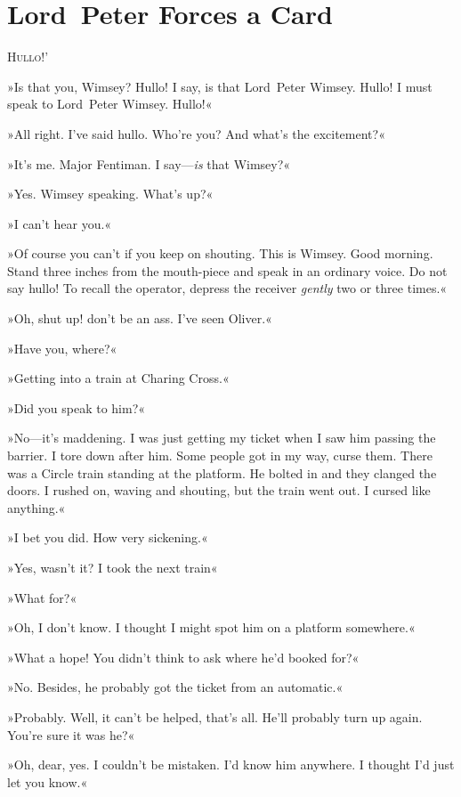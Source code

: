 \chapter{Lord~Peter Forces a Card}

\lettrine[lines=4,ante=‘]{H}{ullo}!' 

\zz
»Is that you, Wimsey? Hullo! I say, is that Lord~Peter Wimsey. Hullo! I must speak to Lord~Peter Wimsey. Hullo!« 

\zz
»All right. I've said hullo. Who're you? And what's the excitement?«

\zz
»It's me. Major Fentiman. I say—\textit{is} that Wimsey?«

»Yes. Wimsey speaking. What's up?«

»I can't hear you.«

»Of course you can't if you keep on shouting. This is Wimsey. Good morning. Stand three inches from the mouth-piece and speak in an ordinary voice. Do not say hullo! To recall the operator, depress the receiver \textit{gently} two or three times.«

»Oh, shut up! don't be an ass. I've seen Oliver.«

»Have you, where?«

»Getting into a train at Charing Cross.«

»Did you speak to him?«

»No—it's maddening. I was just getting my ticket when I saw him passing the barrier. I tore down after him. Some people got in my way, curse them. There was a Circle train standing at the platform. He bolted in and they clanged the doors. I rushed on, waving and shouting, but the train went out. I cursed like anything.«

»I bet you did. How very sickening.«

»Yes, wasn't it? I took the next train\longdash«

»What for?«

»Oh, I don't know. I thought I might spot him on a platform somewhere.«

»What a hope! You didn't think to ask where he'd booked for?«

»No. Besides, he probably got the ticket from an automatic.«

»Probably. Well, it can't be helped, that's all. He'll probably turn up again. You're sure it was he?«

»Oh, dear, yes. I couldn't be mistaken. I'd know him anywhere. I thought I'd just let you know.«

